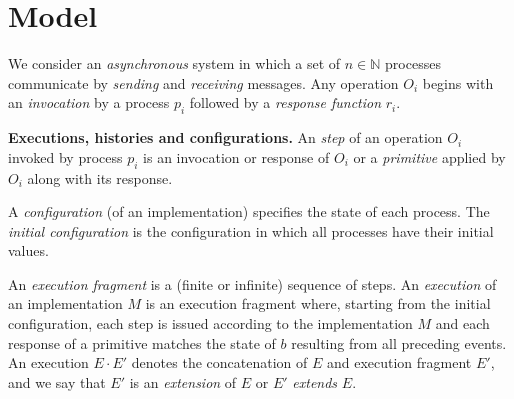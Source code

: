 \section{Model}
\label{sec:model}
%
We consider an \emph{asynchronous} system in which
a set of $n \in \mathbb{N}$ processes communicate by 
\emph{sending} and \emph{receiving} messages.
Any operation $O_i$ begins with an \emph{invocation} by a process $p_i$ followed by a \emph{response
function} $r_i$.

\vspace{1mm}\noindent\textbf{Executions, histories and configurations.}
An \emph{step} of an operation $O_i$ invoked by process $p_i$
is an invocation or response of $O_i$ or a 
\emph{primitive} applied by $O_i$
along with its response.

A \emph{configuration} (of an implementation) specifies the state of each process.
The \emph{initial configuration} is the configuration in which all 
processes have their initial values.

An \emph{execution fragment} is a (finite or infinite) sequence of steps.
An \emph{execution} of an implementation $M$ is an execution
fragment where, starting from the initial configuration, each step is
issued according to the implementation $M$ and each response of a primitive matches the state of $b$ resulting from all
preceding events.
An execution $E\cdot E'$ denotes the concatenation of $E$ and execution fragment $E'$,
and we say that $E'$ is an \emph{extension} of $E$ or $E'$ \emph{extends} $E$.
